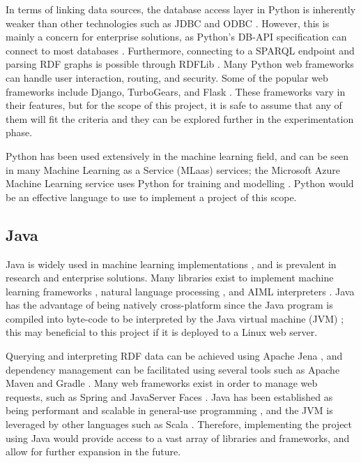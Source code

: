 In terms of linking data sources, the database access layer in Python is inherently weaker than other technologies such as JDBC and ODBC \cite{vermuelen2019}. However, this is mainly a concern for enterprise solutions, as Python’s DB-API specification can connect to most databases \cite{python2017db}. Furthermore, connecting to a SPARQL endpoint and parsing RDF graphs is possible through RDFLib \cite{rdf2019}. Many Python web frameworks can handle user interaction, routing, and security. Some of the popular web frameworks include Django, TurboGears, and Flask \cite{python2020web}. These frameworks vary in their features, but for the scope of this project, it is safe to assume that any of them will fit the criteria and they can be explored further in the experimentation phase.

Python has been used extensively in the machine learning field, and can be seen in many Machine Learning as a Service (MLaas) services; the Microsoft Azure Machine Learning service uses Python for training and modelling \cite{microsoft2019architecture}. Python would be an effective language to use to implement a project of this scope.

\subsection{Java}
Java is widely used in machine learning implementations \cite{witten2005practical, abeel2009java}, and is prevalent in research and enterprise solutions. Many libraries exist to implement machine learning frameworks \cite{kovalev2016deep}, natural language processing \cite{nltk2019}, and AIML interpreters \cite{alice2013}. Java has the advantage of being natively cross-platform since the Java program is compiled into byte-code to be interpreted by the Java virtual machine (JVM) \cite{witten2005practical}; this may beneficial to this project if it is deployed to a Linux web server.

Querying and interpreting RDF data can be achieved using Apache Jena \cite{apachejena}, and dependency management can be facilitated using several tools such as Apache Maven \cite{apachemaven} and Gradle \cite{gradle}. Many web frameworks exist in order to manage web requests, such as Spring \cite{springmanual} and JavaServer Faces \cite{mcclanahan2004javaserver}. Java has been established as being performant and scalable in general-use programming \cite{moreira2000java}, and the JVM is leveraged by other languages such as Scala \cite{odersky2008programming}. Therefore, implementing the project using Java would provide access to a vast array of libraries and frameworks, and allow for further expansion in the future.

